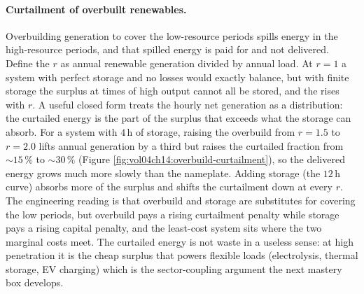 \paragraph{Curtailment of overbuilt renewables.} Overbuilding generation
to cover the low-resource periods spills energy in the high-resource
periods, and that spilled energy is paid for and not delivered. Define
the  $r$ as annual renewable generation divided
by annual load. At $r = 1$ a system with perfect storage and no losses
would exactly balance, but with finite storage the surplus at times of
high output cannot all be stored, and the 
rises with $r$. A useful closed form treats the hourly net generation as
a distribution: the curtailed energy is the part of the surplus that
exceeds what the storage can absorb. For a system with $4\,\si{\hour}$ of
storage, raising the overbuild from $r = 1.5$ to $r = 2.0$ lifts annual
generation by a third but raises the curtailed fraction from $\sim
15\,\%$ to $\sim 30\,\%$ (Figure
\ref{fig:vol04ch14:overbuild-curtailment}), so the delivered energy grows
much more slowly than the nameplate. Adding storage (the $12\,\si{\hour}$
curve) absorbs more of the surplus and shifts the curtailment down at
every $r$. The engineering reading is that overbuild and storage are
substitutes for covering the low periods, but overbuild pays a rising
curtailment penalty while storage pays a rising capital penalty, and the
least-cost system sits where the two marginal costs meet. The curtailed
energy is not waste in a useless sense: at high penetration it is the
cheap surplus that powers flexible loads (electrolysis, thermal storage,
EV charging) which is the sector-coupling argument the next mastery box
develops.



